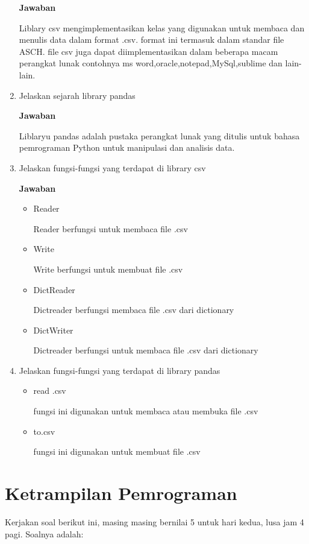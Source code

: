 \begin{enumerate}
\par\textbf{Jawaban} 
\par Liblary csv mengimplementasikan kelas yang digunakan untuk membaca dan menulis data dalam format .csv. format ini termasuk dalam standar file ASCH. file csv juga dapat diimplementasikan dalam beberapa macam perangkat lunak contohnya ms word,oracle,notepad,MySql,sublime dan lain-lain.
\item
Jelaskan sejarah library pandas
\par\textbf{Jawaban}
\par Liblaryu pandas adalah pustaka perangkat lunak yang ditulis untuk bahasa pemrograman Python untuk manipulasi dan analisis data.
\item
Jelaskan fungsi-fungsi yang terdapat di library csv
\par\textbf{Jawaban}
\begin{itemize}
    \item Reader
    \par Reader berfungsi untuk membaca file .csv
    \item Write
    \par Write berfungsi untuk membuat file .csv
    \item DictReader
    \par Dictreader berfungsi membaca file .csv dari dictionary
    \item DictWriter   
    \par Dictreader berfungsi untuk membaca file .csv dari dictionary
\end{itemize}
\item
Jelaskan fungsi-fungsi yang terdapat di library pandas
\begin{itemize}
    \item read .csv
    \par fungsi ini digunakan untuk membaca atau membuka file .csv
    \item to.csv
    \par fungsi ini digunakan untuk membuat file .csv
\end{itemize}
\end{enumerate}

\section{Ketrampilan Pemrograman}
Kerjakan soal berikut ini, masing masing bernilai 5 untuk hari kedua, lusa jam 4 pagi. Soalnya adalah:


